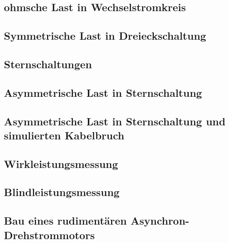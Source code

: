 \documentclass[12pt,english,ngerman]{scrartcl}
\begin{document}
\subsection{ohmsche Last in Wechselstromkreis}

\subsection{Symmetrische Last in Dreieckschaltung}

\subsection{Sternschaltungen}

\subsection{Asymmetrische Last in Sternschaltung}

\subsection{Asymmetrische Last in Sternschaltung und simulierten Kabelbruch}

\subsection{Wirkleistungsmessung}

\subsection{Blindleistungsmessung}

\subsection{Bau eines rudimentären Asynchron-Drehstrommotors}

\newpage

\listoffigures
\listoftables
\end{document}
